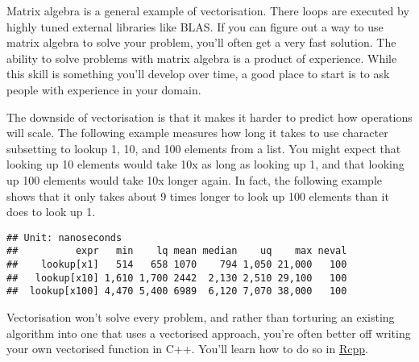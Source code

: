 Matrix algebra is a general example of vectorisation. There loops are
executed by highly tuned external libraries like BLAS. If you can figure
out a way to use matrix algebra to solve your problem, you'll often get
a very fast solution. The ability to solve problems with matrix algebra
is a product of experience. While this skill is something you'll develop
over time, a good place to start is to ask people with experience in
your domain. 

The downside of vectorisation is that it makes it harder to predict how
operations will scale. The following example measures how long it takes
to use character subsetting to lookup 1, 10, and 100 elements from a
list. You might expect that looking up 10 elements would take 10x as
long as looking up 1, and that looking up 100 elements would take 10x
longer again. In fact, the following example shows that it only takes
about 9 times longer to look up 100 elements than it does to look up 1.

\begin{Shaded}
\begin{Highlighting}[]
\StringTok{ }\NormalTok{(}\NormalTok{(}\NormalTok{(}\NormalTok{, }

\StringTok{ }\NormalTok{)}
\StringTok{ }\NormalTok{, } \NormalTok{)}

\NormalTok{(}
\NormalTok{)}
\end{Highlighting}
\end{Shaded}

\begin{verbatim}
## Unit: nanoseconds
##          expr   min    lq mean median    uq    max neval
##    lookup[x1]   514   658 1070    794 1,050 21,000   100
##   lookup[x10] 1,610 1,700 2442  2,130 2,510 29,100   100
##  lookup[x100] 4,470 5,400 6989  6,120 7,070 38,000   100
\end{verbatim}

Vectorisation won't solve every problem, and rather than torturing an
existing algorithm into one that uses a vectorised approach, you're
often better off writing your own vectorised function in C++. You'll
learn how to do so in \protect\hyperlink{rcpp}{Rcpp}.

